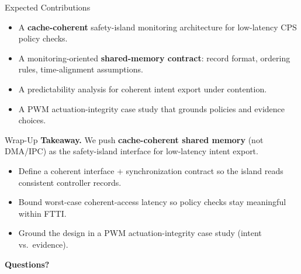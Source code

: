 \documentclass[aspectratio=169,12pt]{beamer}
\newcommand{\hl}[1]{\textcolor{Accent}{\textbf{#1}}}
\newcommand{\FTTI}{FTTI\xspace}
\begin{document}
\begin{frame}{Expected Contributions}
\begin{itemize}
\item A \hl{cache-coherent} safety-island monitoring architecture for low-latency CPS policy checks.
\item A monitoring-oriented \hl{shared-memory contract}: record format, ordering rules, time-alignment assumptions.
\item A predictability analysis for coherent intent export under contention.
\item A PWM actuation-integrity case study that grounds policies and evidence choices.
\end{itemize}
\end{frame}

\begin{frame}{Wrap-Up}
\textbf{Takeaway.} We push \hl{cache-coherent shared memory} (not DMA/IPC) as the safety-island interface for low-latency intent export.

\vspace{0.6em}
\begin{itemize}
\item Define a coherent interface + synchronization contract so the island reads consistent controller records.
\item Bound worst-case coherent-access latency so policy checks stay meaningful within \FTTI.
\item Ground the design in a PWM actuation-integrity case study (intent vs.\ evidence).
\end{itemize}

\vspace{1em}
\begin{center}
  {\Large\color{MidBlue}\textbf{Questions?}}
\end{center}
\end{frame}
\end{document}
